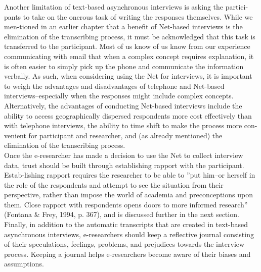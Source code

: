 \documentclass[,a49pt]{book}
\begin{document}
\hspace*{0.5cm} Another limitation of text-based asynchronous interviews is asking the partici-pants to take on the onerous task of writing the responses themselves. While we men-tioned in an earlier chapter that a benefit of Net-based interviews is the elimination of the transcribing process, it must be acknowledged that this task is transferred to the participant. Most of us know of us know from our experience communicating with email that when a complex concept requires explanation, it is often easier to simply pick up the phone and communicate the information verbally. As such, when considering using the Net for interviews, it is important to weigh the advantages and disadvantages of telephone and Net-based interviews--especially when the responses might include complex concepts. Alternatively, the advantages of conducting Net-based interviews include the ability to access geographically dispersed respondents more cost effectively than with telephone interviews, the ability to time shift to make the process more con-venient for participant and researcher, and (as already mentioned) the elimination of the transcribing process.\\

\hspace*{0.5cm} Once the e-researcher has made a decision  to use the Net to collect interview data, trust should be built through establishing rapport with the participant. Estab-lishing rapport requires the researcher to be able to ''put him--or herself in the role of the respondents and attempt to see the situation from their perspective, rather than impose the world of academia and preconceptions upon them. Close rapport with respondents opens doors to more informed research'' (Fontana \& Frey, 1994, p. 367), and is discussed further in the next section.\\
\hspace*{0.5cm} Finally, in addition to the automatic transcripts that are created in text-based asynchronous interviews, e-researchers should keep a reflective journal consisting of their speculations, feelings, problems, and prejudices towards the interview process. Keeping a journal helps e-researchers become aware of their biases and assumptions.
\end{document}
